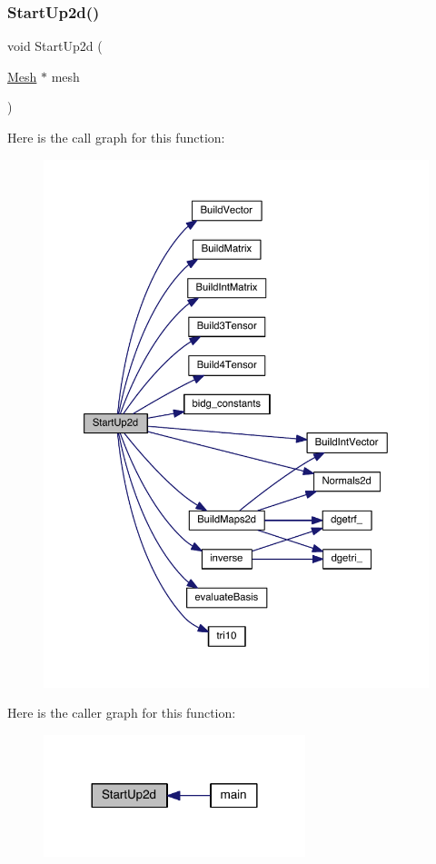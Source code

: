 \subsubsection{\texorpdfstring{Start\+Up2d()}{StartUp2d()}}
{\footnotesize\ttfamily void Start\+Up2d (\begin{DoxyParamCaption}\item[{\hyperlink{a00557_aeffbe0891ab73a4d8964c9cb7978426e}{Mesh} $\ast$}]{mesh }\end{DoxyParamCaption})}

Here is the call graph for this function\+:\nopagebreak
\begin{figure}[H]
\begin{center}
\leavevmode
\includegraphics[width=350pt]{a00596_a35ba318a20f8b83eefe63eeb1e1ac4b0_cgraph}
\end{center}
\end{figure}
Here is the caller graph for this function\+:\nopagebreak
\begin{figure}[H]
\begin{center}
\leavevmode
\includegraphics[width=216pt]{a00596_a35ba318a20f8b83eefe63eeb1e1ac4b0_icgraph}
\end{center}
\end{figure}
